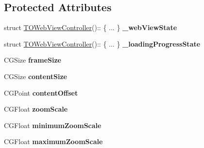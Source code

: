 \subsection*{Protected Attributes}
\begin{DoxyCompactItemize}
\item 
\hypertarget{category_t_o_web_view_controller_07_08_a45099289eec907ffb5c10d37737d8784}{}struct \hyperlink{interface_t_o_web_view_controller}{T\+O\+Web\+View\+Controller}()\+:: \{ ... \}  {\bfseries \+\_\+web\+View\+State}\label{category_t_o_web_view_controller_07_08_a45099289eec907ffb5c10d37737d8784}

\item 
\hypertarget{category_t_o_web_view_controller_07_08_aab6337c15d72e711cfb4cb718633751d}{}struct \hyperlink{interface_t_o_web_view_controller}{T\+O\+Web\+View\+Controller}()\+:: \{ ... \}  {\bfseries \+\_\+loading\+Progress\+State}\label{category_t_o_web_view_controller_07_08_aab6337c15d72e711cfb4cb718633751d}

\item 
\hypertarget{category_t_o_web_view_controller_07_08_a538724b153b7095851ad617d3bc3fcac}{}C\+G\+Size {\bfseries frame\+Size}\label{category_t_o_web_view_controller_07_08_a538724b153b7095851ad617d3bc3fcac}

\item 
\hypertarget{category_t_o_web_view_controller_07_08_a8eb54ffacdb7a6e3f6d4d31f50dd5d45}{}C\+G\+Size {\bfseries content\+Size}\label{category_t_o_web_view_controller_07_08_a8eb54ffacdb7a6e3f6d4d31f50dd5d45}

\item 
\hypertarget{category_t_o_web_view_controller_07_08_a5c1b74cc24ab90a803665bfe669be610}{}C\+G\+Point {\bfseries content\+Offset}\label{category_t_o_web_view_controller_07_08_a5c1b74cc24ab90a803665bfe669be610}

\item 
\hypertarget{category_t_o_web_view_controller_07_08_abc8427852b6b7fd6232b342e5b8e2512}{}C\+G\+Float {\bfseries zoom\+Scale}\label{category_t_o_web_view_controller_07_08_abc8427852b6b7fd6232b342e5b8e2512}

\item 
\hypertarget{category_t_o_web_view_controller_07_08_af6c1773babd446b050eb5c1608070511}{}C\+G\+Float {\bfseries minimum\+Zoom\+Scale}\label{category_t_o_web_view_controller_07_08_af6c1773babd446b050eb5c1608070511}

\item 
\hypertarget{category_t_o_web_view_controller_07_08_a9d1bdafcc7571a7ae58bab935ee26e3a}{}C\+G\+Float {\bfseries maximum\+Zoom\+Scale}\label{category_t_o_web_view_controller_07_08_a9d1bdafcc7571a7ae58bab935ee26e3a}


\end{DoxyCompactItemize}
